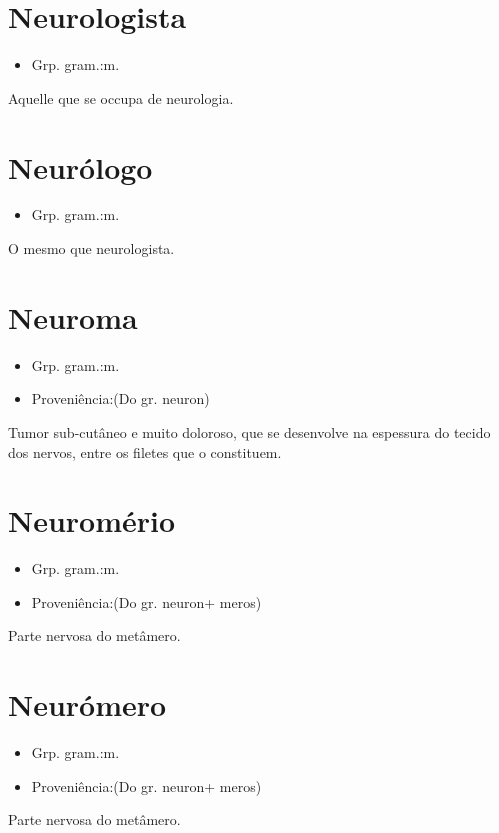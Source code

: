 \section{Neurologista}
\begin{itemize}
\item {Grp. gram.:m.}
\end{itemize}
Aquelle que se occupa de neurologia.
\section{Neurólogo}
\begin{itemize}
\item {Grp. gram.:m.}
\end{itemize}
O mesmo que \textunderscore neurologista\textunderscore .
\section{Neuroma}
\begin{itemize}
\item {Grp. gram.:m.}
\end{itemize}
\begin{itemize}
\item {Proveniência:(Do gr. \textunderscore neuron\textunderscore )}
\end{itemize}
Tumor sub-cutâneo e muito doloroso, que se desenvolve na espessura do tecido dos nervos, entre os filetes que o constituem.
\section{Neuromério}
\begin{itemize}
\item {Grp. gram.:m.}
\end{itemize}
\begin{itemize}
\item {Proveniência:(Do gr. \textunderscore neuron\textunderscore  + \textunderscore meros\textunderscore )}
\end{itemize}
Parte nervosa do metâmero.
\section{Neurómero}
\begin{itemize}
\item {Grp. gram.:m.}
\end{itemize}
\begin{itemize}
\item {Proveniência:(Do gr. \textunderscore neuron\textunderscore  + \textunderscore meros\textunderscore )}
\end{itemize}
Parte nervosa do metâmero.
